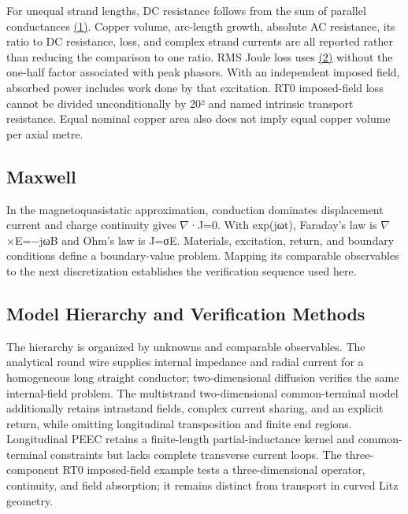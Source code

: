 \documentclass[11pt]{article}
\begin{document}
For unequal strand lengths, DC resistance follows from the sum of parallel conductances \href{report_en_single.pdf#E01}{(1)}. Copper volume, arc-length growth, absolute AC resistance, its ratio to DC resistance, loss, and complex strand currents are all reported rather than reducing the comparison to one ratio. RMS Joule loss uses \href{report_en_single.pdf#E02}{(2)} without the one-half factor associated with peak phasors. With an independent imposed field, absorbed power includes work done by that excitation. RT0 imposed-field loss cannot be divided unconditionally by 20² and named intrinsic transport resistance. Equal nominal copper area also does not imply equal copper volume per axial metre.


\subsection*{Maxwell}
\hypertarget{02.maxwell.heading}{}
In the magnetoquasistatic approximation, conduction dominates displacement current and charge continuity gives \(\nabla\)·J=0. With exp(jωt), Faraday’s law is \(\nabla\)×E=−jωB and Ohm’s law is J=σE. Materials, excitation, return, and boundary conditions define a boundary-value problem. Mapping its comparable observables to the next discretization establishes the verification sequence used here.


\subsection*{Model Hierarchy and Verification Methods}
\hypertarget{02.hierarchy.heading}{}
The hierarchy is organized by unknowns and comparable observables. The analytical round wire supplies internal impedance and radial current for a homogeneous long straight conductor; two-dimensional diffusion verifies the same internal-field problem. The multistrand two-dimensional common-terminal model additionally retains intrastand fields, complex current sharing, and an explicit return, while omitting longitudinal transposition and finite end regions. Longitudinal PEEC retains a finite-length partial-inductance kernel and common-terminal constraints but lacks complete transverse current loops. The three-component RT0 imposed-field example tests a three-dimensional operator, continuity, and field absorption; it remains distinct from transport in curved Litz geometry.
\end{document}
